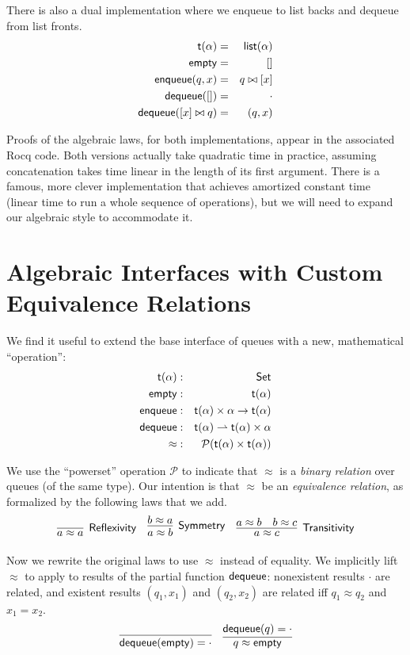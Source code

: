 \documentclass{amsbook}
\theoremstyle{definition}
\theoremstyle{remark}
\numberwithin{section}{chapter}
\numberwithin{equation}{chapter}
\begin{document}
There is also a dual implementation where we enqueue to list backs and dequeue from list fronts.
\begin{eqnarray*}
  \mathsf{t(\alpha)} &=& \mathsf{list}(\alpha) \\
  \mathsf{empty} &=& [] \\
  \mathsf{enqueue}(q, x) &=& q \bowtie [x] \\
  \mathsf{dequeue}([]) &=& \cdot \\
  \mathsf{dequeue}([x] \bowtie q) &=& (q, x)
\end{eqnarray*}

Proofs of the algebraic laws, for both implementations, appear in the associated Rocq code.
Both versions actually take quadratic time in practice, assuming concatenation takes time linear in the length of its first argument.
There is a famous, more clever implementation that achieves amortized constant time (linear time to run a whole sequence of operations), but we will need to expand our algebraic style to accommodate it.


\section{Algebraic Interfaces with Custom Equivalence Relations}

We find it useful to extend the base interface of queues with a new, mathematical ``operation'':
\begin{eqnarray*}
  \mathsf{t}(\alpha) &:& \mathsf{Set} \\
  \mathsf{empty} &:& \mathsf{t}(\alpha) \\
  \mathsf{enqueue} &:& \mathsf{t}(\alpha) \times \alpha \to \mathsf{t}(\alpha) \\
  \mathsf{dequeue} &:& \mathsf{t}(\alpha) \rightharpoonup \mathsf{t}(\alpha) \times \alpha \\
  \mathsf{\approx} &:& \mathcal P(\mathsf{t}(\alpha) \times \mathsf{t}(\alpha))
\end{eqnarray*}

We use the ``powerset'' operation $\mathcal P$ to indicate that $\approx$ is a \emph{binary relation} over queues (of the same type).
Our intention is that $\approx$ be an \emph{equivalence relation}, as formalized by the following laws that we add.
$$\infer[\mathsf{Reflexivity}]{a \approx a}{}
\quad \infer[\mathsf{Symmetry}]{a \approx b}{b \approx a}
\quad \infer[\mathsf{Transitivity}]{a \approx c}{a \approx b & b \approx c}$$

Now we rewrite the original laws to use $\approx$ instead of equality.
We implicitly lift $\approx$ to apply to results of the partial function $\mathsf{dequeue}$: nonexistent results $\cdot$ are related, and existent results $(q_1, x_1)$ and $(q_2, x_2)$ are related iff $q_1 \approx q_2$ and $x_1 = x_2$.
$$\infer{\mt{dequeue}(\mt{empty}) = \cdot}{}
\quad \infer{q \approx \mt{empty}}{\mt{dequeue}(q) = \cdot}$$
\end{document}
